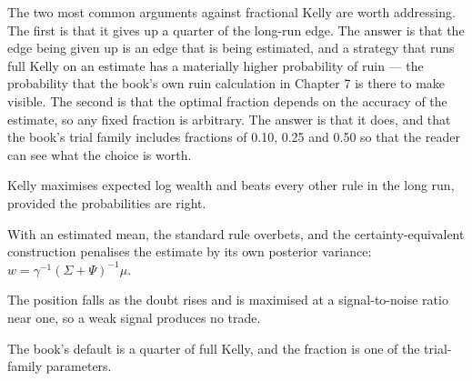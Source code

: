 The two most common arguments against fractional Kelly are worth
addressing. The first is that it gives up a quarter of the long-run edge.
The answer is that the edge being given up is an edge that is being
estimated, and a strategy that runs full Kelly on an estimate has a
materially higher probability of ruin --- the probability that the
book's own ruin calculation in Chapter 7 is there to make visible. The
second is that the optimal fraction depends on the accuracy of the
estimate, so any fixed fraction is arbitrary. The answer is that it does,
and that the book's trial family includes fractions of 0.10, 0.25 and
0.50 so that the reader can see what the choice is worth.

\begin{keytakeaways}
\item Kelly maximises expected log wealth and beats every other rule in
the long run, provided the probabilities are right.
\item With an estimated mean, the standard rule overbets, and the
certainty-equivalent construction penalises the estimate by its own
posterior variance: \(w = \gamma^{-1}(\Sigma+\Psi)^{-1}\mu\).
\item The position falls as the doubt rises and is maximised at a
signal-to-noise ratio near one, so a weak signal produces no trade.
\item The book's default is a quarter of full Kelly, and the fraction is
one of the trial-family parameters.
\end{keytakeaways}
